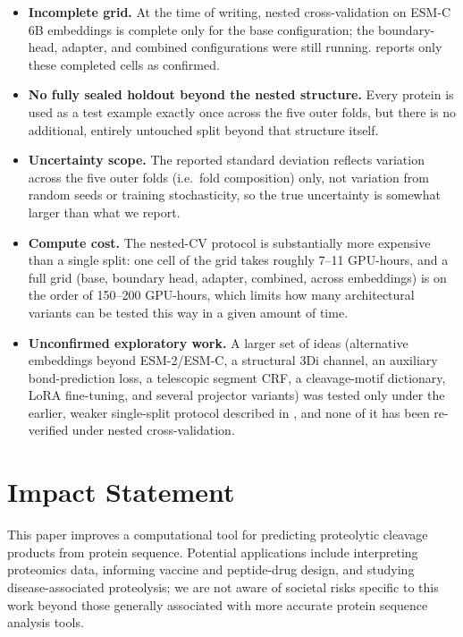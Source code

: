 \documentclass{article}
\begin{document}
\begin{itemize}
  \item \textbf{Incomplete grid.} At the time of writing, nested cross-validation on ESM-C 6B embeddings is complete only for the base configuration; the boundary-head, adapter, and combined configurations were still running.  reports only these completed cells as confirmed.
  \item \textbf{No fully sealed holdout beyond the nested structure.} Every protein is used as a test example exactly once across the five outer folds, but there is no additional, entirely untouched split beyond that structure itself.
  \item \textbf{Uncertainty scope.} The reported standard deviation reflects variation across the five outer folds (i.e.\ fold composition) only, not variation from random seeds or training stochasticity, so the true uncertainty is somewhat larger than what we report.
  \item \textbf{Compute cost.} The nested-CV protocol is substantially more expensive than a single split: one cell of the grid takes roughly 7--11 GPU-hours, and a full grid (base, boundary head, adapter, combined, across embeddings) is on the order of 150--200 GPU-hours, which limits how many architectural variants can be tested this way in a given amount of time.
  \item \textbf{Unconfirmed exploratory work.} A larger set of ideas (alternative embeddings beyond ESM-2/ESM-C, a structural 3Di channel, an auxiliary bond-prediction loss, a telescopic segment CRF, a cleavage-motif dictionary, LoRA fine-tuning, and several projector variants) was tested only under the earlier, weaker single-split protocol described in , and none of it has been re-verified under nested cross-validation.
\end{itemize}

\section*{Impact Statement}
This paper improves a computational tool for predicting proteolytic cleavage products from protein sequence. Potential applications include interpreting proteomics data, informing vaccine and peptide-drug design, and studying disease-associated proteolysis; we are not aware of societal risks specific to this work beyond those generally associated with more accurate protein sequence analysis tools.
\end{document}
